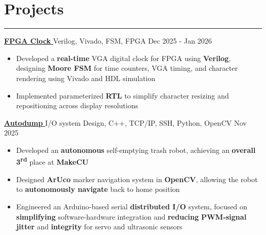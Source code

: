 \documentclass[10pt]{article}
\newcommand{\MHtLsep}{-0.7em}
\newcommand{\LtHsep}{0.9em}
\begin{document}
\section*{\large {Projects}} \vspace{\MHtLsep} \hrule 
\vspace{\LtHsep}

\href{https://www.ryanqin.com/projects.html}{\textbf{FPGA Clock \footnotesize\faExternalLink*}} \hspace{\WEVBsep}\textbar\hspace{\WEVBsep} Verilog, Vivado, FSM, FPGA \hfill Dec 2025 - Jan 2026 \\[\PTtPsep]
\begin{itemize}
    \item  Developed a \textbf{real-time} VGA digital clock for FPGA using \textbf{Verilog}, designing \textbf{Moore FSM} for time counters, VGA timing, and character rendering using Vivado and HDL simulation \\[\PtPsep]
    \item  Implemented parameterized \textbf{\small RTL} to simplify character resizing and repositioning across display resolutions \\[\PStPSsep]
\end{itemize}

\noindent\href{https://devpost.com/software/autodump-autonomous-self-emptying-trash-rover}{\textbf{Autodump \footnotesize\faExternalLink*}} \hspace{\WEVBsep}\textbar\hspace{\WEVBsep} I/O system Design, C++, TCP/IP, SSH, Python, OpenCV \hfill Nov 2025 \\[\PTtPsep]
\begin{itemize}
    \item  Developed an \textbf{autonomous} self-emptying trash robot, achieving an \textbf{overall 3\textsuperscript{rd}} place at \textbf{MakeCU} \\[\PtPsep]
    \item  Designed \textbf{ArUco} marker navigation system in \textbf{OpenCV}, allowing the robot to \textbf{autonomously navigate} back to home position \\[\PtPsep]
    \item  Engineered an Arduino-based serial \textbf{distributed I/O} system, focused on \textbf{simplifying} software-hardware integration and \hrulefill \textbf{reducing} \textbf{PWM-signal jitter} and \textbf{integrity} for servo and ultrasonic sensors \\[\PStPSsep]
\end{itemize}
\end{document}
